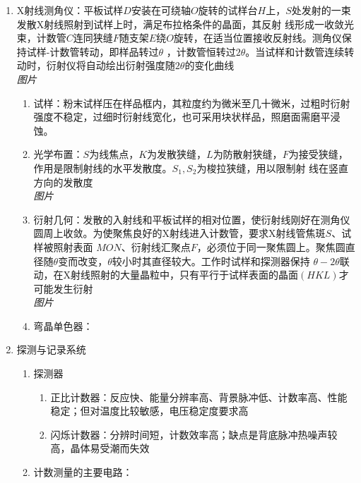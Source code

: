 \documentclass[12pt,a4paper]{article}
\begin{document}
\begin{enumerate}
            \begin{enumerate}
                \item X射线测角仪：平板试样$D$安装在可绕轴$O$旋转的试样台$H$上，$S$处发射的一束发散X射线照射到试样上时，满足布拉格条件的晶面，其反射
                    线形成一收敛光束，计数管$C$连同狭缝$F$随支架$E$绕$O$旋转，在适当位置接收反射线。测角仪保持试样-计数管转动，即样品转过$\theta$
                    ，计数管恒转过$2\theta$。当试样和计数管连续转动时，衍射仪将自动绘出衍射强度随$2\theta$的变化曲线 \\\emph{图片}
                \begin{enumerate}
                    \item 试样：粉末试样压在样品框内，其粒度约为微米至几十微米，过粗时衍射强度不稳定，过细时衍射线宽化，也可采用块状样品，照磨面需磨平浸蚀。
                    \item 光学布置：$S$为线焦点，$K$为发散狭缝，$L$为防散射狭缝，$F$为接受狭缝，作用是限制射线的水平发散度。$S_1,S_2$为梭拉狭缝，用以限制射
                        线在竖直方向的发散度  \\\emph{图片}
                    \item 衍射几何：发散的入射线和平板试样的相对位置，使衍射线刚好在测角仪圆周上收敛。为使聚焦良好的X射线进入计数管，要求X射线管焦斑$S$、试样被照射表面
                        $MON$、衍射线汇聚点$F$，必须位于同一聚焦圆上。聚焦圆直径随$\theta$变而改变，$\theta$较小时其直径较大。工作时试样和探测器保持
                        $\theta-2\theta$联动，在X射线照射的大量晶粒中，只有平行于试样表面的晶面$(HKL)$才可能发生衍射 \\\emph{图片}
                    \item 弯晶单色器：
                \end{enumerate}
                \item 探测与记录系统
                \begin{enumerate}
                    \item 探测器
                    \begin{enumerate}
                        \item 正比计数器：反应快、能量分辨率高、背景脉冲低、计数率高、性能稳定；但对温度比较敏感，电压稳定度要求高
                        \item 闪烁计数器：分辨时间短，计数效率高；缺点是背底脉冲热噪声较高，晶体易受潮而失效
                    \end{enumerate}
                    \item 计数测量的主要电路：

\end{enumerate}
\end{enumerate}
\end{enumerate}
\end{document}
